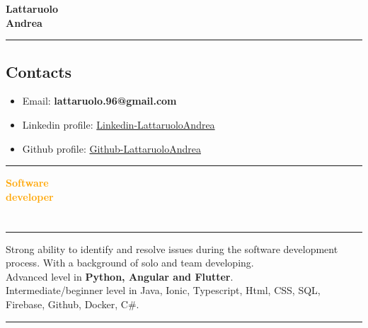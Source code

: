 \documentclass[a4paper,10pt]{article}
\begin{document}
\thispagestyle{empty} %

\noindent
\begin{minipage}[t]{0.25\textwidth}
    \vspace{0.3cm}
    { \LARGE  \textbf{Lattaruolo \\[0.1cm] Andrea}} \\
\end{minipage}
\hfill
\begin{minipage}[t]{0.75\textwidth}
    \rule{\linewidth}{0.5mm} %
    \subsection*{Contacts}
    \begin{itemize}[leftmargin=1cm]
        \item Email: \textbf{lattaruolo.96@gmail.com}
        \item Linkedin profile: \href{https://github.com/LattaruoloAndrea}{Linkedin-LattaruoloAndrea} 
        \item Github profile: \href{https://github.com/LattaruoloAndrea}{Github-LattaruoloAndrea} 
    \end{itemize}
    \rule{\linewidth}{0.5mm}
\end{minipage}

\begin{minipage}[t]{0.25\textwidth}
    { \LARGE \textbf{\textcolor{orange}{\newline Software \\[0.1cm] developer}}} \\   
    \section*{}
    \rule{0.6cm}{0.3mm}
\end{minipage}
\hfill
\begin{minipage}[t]{0.75\textwidth}
    
    Strong ability to identify and resolve issues during the software development process. With a background of solo and team developing. \\[0.3cm]
    {\large Advanced level in  \textbf{Python, Angular and Flutter}.  \\[0.2cm]
    Intermediate/beginner level in Java, Ionic, Typescript, Html, CSS, SQL, Firebase, Github, Docker, C\#}.

    \rule{\linewidth}{0.5mm}
\end{minipage}
\end{document}
